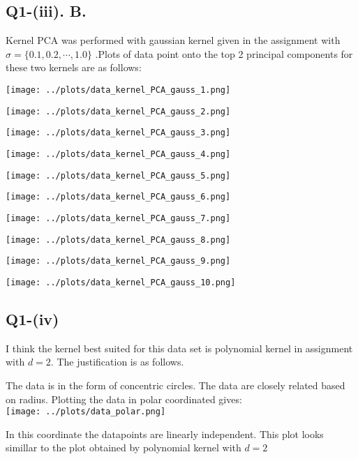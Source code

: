 \subsection*{Q1-(iii). B.}

Kernel PCA was performed with gaussian kernel given in the assignment with $\sigma = \{0.1, 0.2, \cdots, 1.0\}$ .Plots of data point onto the top 2 principal components for these two kernels are as follows:

	\centering
	\texttt{[image: ../plots/data\_kernel\_PCA\_gauss\_1.png]}


	\centering
	\texttt{[image: ../plots/data\_kernel\_PCA\_gauss\_2.png]}


	\centering
	\texttt{[image: ../plots/data\_kernel\_PCA\_gauss\_3.png]}


	\centering
	\texttt{[image: ../plots/data\_kernel\_PCA\_gauss\_4.png]}


	\centering
	\texttt{[image: ../plots/data\_kernel\_PCA\_gauss\_5.png]}


	\centering
	\texttt{[image: ../plots/data\_kernel\_PCA\_gauss\_6.png]}


	\centering
	\texttt{[image: ../plots/data\_kernel\_PCA\_gauss\_7.png]}

 
	\centering
	\texttt{[image: ../plots/data\_kernel\_PCA\_gauss\_8.png]}

	\centering
	\texttt{[image: ../plots/data\_kernel\_PCA\_gauss\_9.png]}

	\centering
	\texttt{[image: ../plots/data\_kernel\_PCA\_gauss\_10.png]}


\subsection*{Q1-(iv)}

\raggedright

I think the kernel best suited for this data set is polynomial kernel in assignment with $d = 2$. The justification is as follows. 

The data is in the form of concentric circles. The data are closely related based on radius. Plotting the data in polar coordinated gives:\\


\centering
\texttt{[image: ../plots/data\_polar.png]}


\raggedright
In this coordinate the datapoints are linearly independent. 
This plot looks simillar to the plot obtained by polynomial kernel with $d=2$

